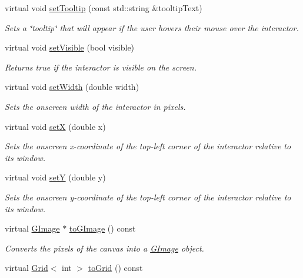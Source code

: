 \begin{DoxyCompactItemize}
virtual void \mbox{\hyperlink{classGInteractor_a039e0e49beaecc275efce02d416acea8}{set\+Tooltip}} (const std\+::string \&tooltip\+Text)
\begin{DoxyCompactList}\small\item\em Sets a \char`\"{}tooltip\char`\"{} that will appear if the user hovers their mouse over the interactor. \end{DoxyCompactList}\item 
virtual void \mbox{\hyperlink{classGInteractor_a18e44e30b31525a243960ca3928125aa}{set\+Visible}} (bool visible)
\begin{DoxyCompactList}\small\item\em Returns true if the interactor is visible on the screen. \end{DoxyCompactList}\item 
virtual void \mbox{\hyperlink{classGInteractor_aa3f3fba4cb131baa8696ba01e3bceca1}{set\+Width}} (double width)
\begin{DoxyCompactList}\small\item\em Sets the onscreen width of the interactor in pixels. \end{DoxyCompactList}\item 
virtual void \mbox{\hyperlink{classGInteractor_a9c18fcc579333bf9653d13ad2b372e39}{setX}} (double x)
\begin{DoxyCompactList}\small\item\em Sets the onscreen x-\/coordinate of the top-\/left corner of the interactor relative to its window. \end{DoxyCompactList}\item 
virtual void \mbox{\hyperlink{classGInteractor_a7d57e2a5c35d27feb58fd498a3cf82b9}{setY}} (double y)
\begin{DoxyCompactList}\small\item\em Sets the onscreen y-\/coordinate of the top-\/left corner of the interactor relative to its window. \end{DoxyCompactList}\item 
virtual \mbox{\hyperlink{classGImage}{G\+Image}} $\ast$ \mbox{\hyperlink{classGCanvas_aa2b5affed24054a09bddfe568d11200b}{to\+G\+Image}} () const
\begin{DoxyCompactList}\small\item\em Converts the pixels of the canvas into a \mbox{\hyperlink{classGImage}{G\+Image}} object. \end{DoxyCompactList}\item 
virtual \mbox{\hyperlink{classGrid}{Grid}}$<$ int $>$ \mbox{\hyperlink{classGCanvas_a2f9b15856aaf66aa95cfd7405bd972cc}{to\+Grid}} () const

\end{DoxyCompactItemize}
